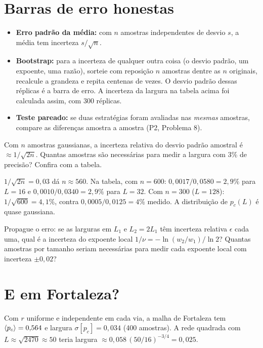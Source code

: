 \documentclass[11pt]{article}
\begin{document}
\section{Barras de erro honestas}

\begin{ideia}
\begin{itemize}
  \item \textbf{Erro padrão da média:} com $n$ amostras independentes de desvio $s$, a média tem incerteza $s/\sqrt n$.
  \item \textbf{Bootstrap:} para a incerteza de qualquer outra coisa (o desvio padrão, um expoente, uma razão), sorteie com reposição $n$ amostras dentre as $n$ originais, recalcule a grandeza e repita centenas de vezes. O desvio padrão dessas réplicas é a barra de erro. A incerteza da largura na tabela acima foi calculada assim, com 300 réplicas.
  \item \textbf{Teste pareado:} se duas estratégias foram avaliadas nas \emph{mesmas} amostras, compare as diferenças amostra a amostra (P2, Problema 8).
\end{itemize}
\end{ideia}

\begin{exemplo}
Com $n$ amostras gaussianas, a incerteza relativa do desvio padrão amostral é $\approx1/\sqrt{2n}$. Quantas amostras são necessárias para medir a largura com 3\% de precisão? Confira com a tabela.
\end{exemplo}
\begin{solucao}
$1/\sqrt{2n} = 0{,}03$ dá $n\approx560$. Na tabela, com $n=600$: $0{,}0017/0{,}0580 = 2{,}9\%$ para $L=16$ e $0{,}0010/0{,}0340 = 2{,}9\%$ para $L=32$. Com $n=300$ ($L=128$): $1/\sqrt{600} = 4{,}1\%$, contra $0{,}0005/0{,}0125 = 4\%$ medido. A distribuição de $p_c(L)$ é quase gaussiana.
\end{solucao}

 Propague o erro: se as larguras em $L_1$ e $L_2 = 2L_1$ têm incerteza relativa $\epsilon$ cada uma, qual é a incerteza do expoente local $1/\nu = -\ln(w_2/w_1)/\ln2$? Quantas amostras por tamanho seriam necessárias para medir cada expoente local com incerteza $\pm0{,}02$?

\section{E em Fortaleza?}

Com $r$ uniforme e independente em cada via, a malha de Fortaleza tem $\left\langle p_c \right\rangle = 0{,}564$ e largura $\sigma[p_c] = 0{,}034$ (400 amostras). A rede quadrada com $L\approx\sqrt{2470}\approx50$ teria largura $\approx0{,}058\,(50/16)^{-3/4} = 0{,}025$.
\end{document}

